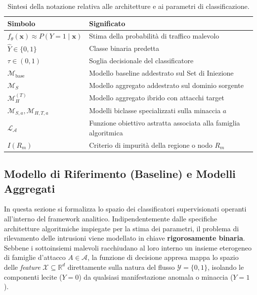 \begin{table}[H]
    \centering
    \small
    \caption{Sintesi della notazione relativa alle architetture e ai parametri di classificazione.}
    \label{tab:notazione_modelli}
    \begin{tabularx}{\textwidth}{
        l
        >{\raggedright\arraybackslash}X
    }
        \toprule
        \textbf{Simbolo} & \textbf{Significato} \\
        \midrule

        $f_\theta(\mathbf{x}) \approx P(Y=1 \mid \mathbf{x})$ &
        Stima della probabilità di traffico malevolo \\

        $\hat{Y} \in \{0,1\}$ &
        Classe binaria predetta \\

        $\tau \in (0,1)$ &
        Soglia decisionale del classificatore \\

        $\mathcal{M}_{\text{base}}$ &
        Modello baseline addestrato sul Set di Iniezione \\

        $\mathcal{M}_{S}$ &
        Modello aggregato addestrato sul dominio sorgente \\

        $\mathcal{M}_{H}^{(T)}$ &
        Modello aggregato ibrido con attacchi target \\

        $\mathcal{M}_{S,a}, \mathcal{M}_{H,T,a}$ &
        Modelli biclasse specializzati sulla minaccia $a$ \\

        $\mathcal{L}_{\mathcal{A}}$ &
        Funzione obiettivo astratta associata alla famiglia algoritmica \\

        $I(R_m)$ &
        Criterio di impurità della regione o nodo $R_m$ \\

        \bottomrule
    \end{tabularx}
\end{table}

\subsection{Modello di Riferimento (Baseline) e Modelli Aggregati}
\label{subsec:modelli_aggregati}

In questa sezione si formalizza lo spazio dei classificatori supervisionati operanti all'interno del framework analitico. Indipendentemente dalle specifiche architetture algoritmiche impiegate per la stima dei parametri, il problema di rilevamento delle intrusioni viene modellato in chiave \textbf{rigorosamente binaria}. Sebbene i sottoinsiemi malevoli racchiudano al loro interno un insieme eterogeneo di famiglie d'attacco $A \in \mathcal{A}$, la funzione di decisione appresa mappa lo spazio delle \textit{feature} $\mathcal{X} \subseteq \mathbb{R}^d$ direttamente sulla natura del flusso $\mathcal{Y} = \{0, 1\}$, isolando le componenti lecite ($Y = 0$) da qualsiasi manifestazione anomala o minaccia ($Y = 1$).

